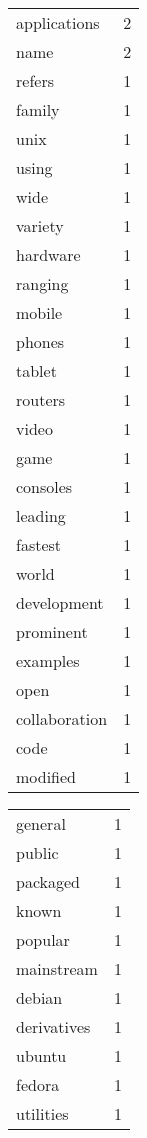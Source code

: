 \begin{center}
\begin{scriptsize}
\begin{tabular}{|ll|}
applications   & 2\\%
name           & 2\\%
refers         & 1\\%
family         & 1\\%
unix           & 1\\%
using          & 1\\%
wide           & 1\\%
variety        & 1\\%
hardware       & 1\\%
ranging        & 1\\%
mobile         & 1\\%
phones         & 1\\%
tablet         & 1\\%
routers        & 1\\%
video          & 1\\%
game           & 1\\%
consoles       & 1\\%
leading        & 1\\%
fastest        & 1\\%
world          & 1\\%
development    & 1\\%
prominent      & 1\\%
examples       & 1\\%
open           & 1\\%
collaboration  & 1\\%
code           & 1\\%
modified       & 1\\%
\hline
\end{tabular}
\begin{tabular}{|ll|}
\hline
general        & 1\\%
public         & 1\\%
packaged       & 1\\%
known          & 1\\%
popular        & 1\\%
mainstream     & 1\\%
debian         & 1\\%
derivatives    & 1\\%
ubuntu         & 1\\%
fedora         & 1\\%
utilities      & 1\\%

\end{tabular}
\end{scriptsize}
\end{center}
